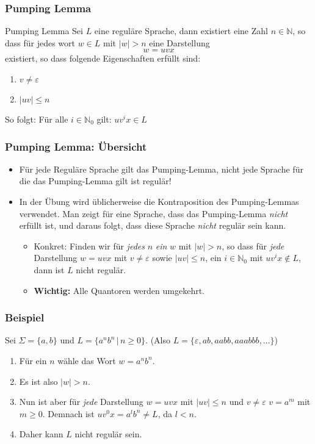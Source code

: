 \documentclass{beamer}
\begin{document}
\begin{frame}
\frametitle{Pumping Lemma}
\begin{exampleblock}{Pumping Lemma}
Sei $L$ eine reguläre Sprache, dann existiert eine Zahl $n \in \mathbb{N}$, so dass für jedes wort $w \in L$ mit $\left|w \right| > n$ eine Darstellung $$w = uvx$$ existiert, so dass folgende Eigenschaften erfüllt sind:

\begin{enumerate}
\item $v \neq \varepsilon$ 
\item $\left|uv\right| \leq n$ 
\end{enumerate}
So folgt: Für alle $i \in \mathbb{N}_0$ gilt: $uv^ix \in L$
\end{exampleblock}
\end{frame}
\begin{frame}
\frametitle{Pumping Lemma: Übersicht}
\begin{itemize}
\item Für jede Reguläre Sprache gilt das Pumping-Lemma, nicht jede Sprache für die das Pumping-Lemma gilt ist regulär!
\item In der Übung wird üblicherweise die Kontraposition des Pumping-Lemmas verwendet. Man zeigt für eine Sprache, dass das Pumping-Lemma \emph{nicht} erfüllt ist, und daraus folgt, dass diese Sprache \emph{nicht} regulär sein kann.
\begin{itemize}
\item Konkret: Finden wir für \emph{jedes} $n$ \emph{ein} $w$ mit $\left|w\right| > n$, so dass für \emph{jede} Darstellung $w = uvx$ mit $v \neq \varepsilon$ sowie $\left|uv\right| \leq n$, ein $i \in \mathbb{N}_0$ mit $uv^ix \notin L$, dann ist $L$ nicht regulär.
\item \textbf{Wichtig:} Alle Quantoren werden umgekehrt.
\end{itemize}
\end{itemize}
\end{frame}

\begin{frame}
\frametitle{Beispiel}
Sei $\Sigma = \{a, b\}$ und $L = \{a^nb^n\,|\,n\geq0\}$. (Also $L = \{\varepsilon,ab, aabb, aaabbb, \ldots\}$)
\begin{enumerate}
\item Für ein $n$ wähle das Wort $w = a^nb^n$.
\item Es ist also $\left|w\right| > n$.
\item Nun ist aber für \emph{jede} Darstellung $w = uvx$ mit $\left|uv\right| \leq n$ und $v \neq \varepsilon$ $v = a^m$ mit $m \geq 0$. Demnach ist $uv^0x = a^lb^n \neq L$, da $l < n$.
\item Daher kann $L$ nicht regulär sein.
\end{enumerate}

\end{frame}
\end{document}
